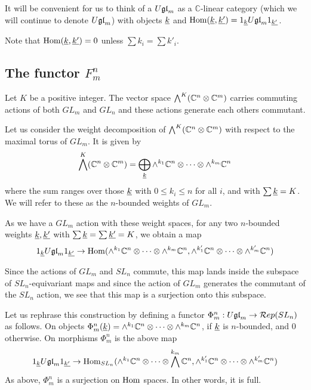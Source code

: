 \documentclass[11pt,leqno]{article}
\begin{document}
It will be convenient for us to think of a $U\mathfrak{gl}_{m} $ as a $\mathbb C$-linear category (which we will continue to denote $U\mathfrak{gl}_{m}$) with objects $ {\underline{k}} $ and $ \operatorname{Hom}({\underline{k}}, {\underline{k'}}) = 1_{\underline{k}} U\mathfrak{gl}_{m} 1_{\underline{k'}}$.

Note that $ \operatorname{Hom}({\underline{k}}, {\underline{k'}}) = 0 $ unless $ \sum k_i = \sum k'_i $.


\subsection{The functor $F_m^n$}
Let $K $ be a positive integer.  The vector space $ \bigwedge^K(\mathbb C^n \otimes \mathbb C^m) $ carries commuting actions of both $ GL_m $ and $ GL_n $ and these actions generate each others commutant.  

Let us consider the weight decomposition of $\bigwedge^K(\mathbb C^n \otimes \mathbb C^m)$  with respect to the maximal torus of $ GL_m $.  It is given by 
\begin{equation}
 \bigwedge^K(\mathbb C^n \otimes \mathbb C^m) = \bigoplus_{{\underline{k}}} \wedge^{k_1} \mathbb C^n \otimes \cdots \otimes \wedge^{k_m} \mathbb C^n
 \end{equation}
where the sum ranges over those $ {\underline{k}} $ with $ 0 \le k_i \le n $ for all $ i $, and with $\sum {\underline{k}} = K$.  We will refer to these as the $n$-bounded weights of $ GL_m$.

As we have a $ GL_m$ action with these weight spaces, for any two $n$-bounded weights $ {\underline{k}}, {\underline{k'}}$ with $ \sum {\underline{k}} = \sum {\underline{k'}} = K$, we obtain a map
$$
1_{\underline{k}} U\mathfrak{gl}_{m} 1_{\underline{k'}} \rightarrow \operatorname{Hom}(\wedge^{k_1} \mathbb C^n \otimes \cdots \otimes \wedge^{k_m} \mathbb C^n, \wedge^{k'_1} \mathbb C^n \otimes \cdots \otimes \wedge^{k'_m} \mathbb C^n)
$$

Since the actions of $GL_m $ and $ SL_n $ commute, this map lands inside the subspace of $ SL_n$-equivariant maps and since the action of $ GL_m$ generates the commutant of the $ SL_n $ action, we see that this map is a surjection onto this subspace.

Let us rephrase this construction by defining a functor $ \Phi_m^n : U\mathfrak{gl}_{m} \rightarrow \mathcal{R}ep(SL_{n}) $ as follows.  On objects $ \Phi_m^n({\underline{k}}) = \wedge^{k_1} \mathbb C^n \otimes \cdots \otimes \wedge^{k_m} \mathbb C^n $, if $ {\underline{k}} $ is $n$-bounded, and 0 otherwise.  On morphisms $ \Phi_m^n $ is the above map 
$$
1_{\underline{k}} U\mathfrak{gl}_{m} 1_{\underline{k'}} \rightarrow \operatorname{Hom}_{SL_n}(\wedge^{k_1} \mathbb C^n \otimes \cdots \otimes \bigwedge^{k_m} \mathbb C^n, \wedge^{k'_1} \mathbb C^n \otimes \cdots \otimes \wedge^{k'_m} \mathbb C^n)
$$
As above, $ \Phi_m^n $ is a surjection on $\operatorname{Hom}$ spaces.  In other words, it is full.
\end{document}
